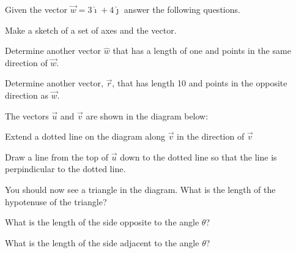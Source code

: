 \begin{problem}
  \item Given the vector $\vec{w}=3\hat{\imath} +4 \hat{\jmath}$ answer the following questions.

    \begin{subproblem}
        \item Make a sketch of a set of axes and the vector.
        \vfill
        \item Determine another vector $\hat{w}$ that has a length of one and points in the same direction of $\vec{w}$.
        \vfill
        \item Determine another vector, $\vec{r}$, that has length 10 and points in the opposite direction as $\vec{w}$.
        \vfill
    \end{subproblem}

    \clearpage

  \item The vectors $\vec{u}$ and $\vec{v}$ are shown in the diagram below:


  \begin{subproblem}
    \item Extend a dotted line on the diagram along $\vec{v}$ in the direction of $\vec{v}$
    \item Draw a line from the top of $\vec{u}$ down to the dotted line so that the line is perpindicular to the dotted line.
    \item You should now see a triangle in the diagram. What is the length of the hypotenuse of the triangle?
      \vfill
    \item What is the length of the side opposite to the angle $\theta$?
      \vfill
    \item What is the length of the side adjacent to the angle $\theta$?
      \vfill


\end{subproblem}
\end{problem}
